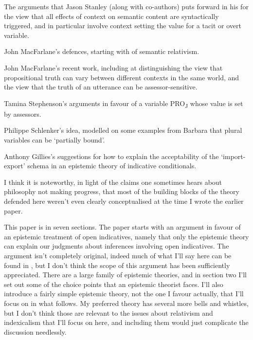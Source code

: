 \medskip
\renewcommand{\labelenumi}{\arabic{enumi}.}
\begin{enumerate*}
\item The arguments that Jason Stanley (along with co-authors) puts forward in his \citeyearpar{Stanley2007-STALIC} for the view that all effects of context on semantic content are syntactically triggered, and in particular involve context setting the value for a tacit or overt variable. 
\item John MacFarlane's defences, starting with \cite{MacFarlane2003-MACFCA-2} of semantic relativism.
\item John MacFarlane's recent work, including \cite{MacFarlane2009-MACNC} at distinguishing the view that propositional truth can vary between different contexts in the same world, and the view that the truth of an utterance can be assessor-sensitive.
\item Tamina Stephenson's \citeyearpar{Stephenson2007} arguments in favour of a variable PRO\textsubscript{J} whose value is set by assessors.
\item Philippe Schlenker's \citeyearpar{Schlenker2003} idea, modelled on some examples from Barbara  \cite{Partee1989} that plural variables can be `partially bound'.
\item Anthony Gillies's \citeyearpar{Gillies2009-GILOTF} suggestions for how to explain the acceptability of the `import\nobreakdash-export' schema in an epistemic theory of indicative conditionals.
\end{enumerate*}

\noindent I think it is noteworthy, in light of the claims one sometimes hears about philosophy not making progress, that most of the building blocks of the theory defended here weren't even clearly conceptualised at the time I wrote the earlier paper.

This paper is in seven sections. The paper starts with an argument in favour of an epistemic treatment of open indicatives, namely that only the epistemic theory can explain our judgments about inferences involving open indicatives. The argument isn't completely original, indeed much of what I'll say here can be found in \cite{Stalnaker1975-STAIC}, but I don't think the scope of this argument has been sufficiently appreciated. There are a large family of epistemic theories, and in section two I'll set out some of the choice points that an epistemic theorist faces. I'll also introduce a fairly simple epistemic theory, not the one I favour actually, that I'll focus on in what follows. My preferred theory has several more bells and whistles, but I don't think those are relevant to the issues about relativism and indexicalism that I'll focus on here, and including them would just complicate the discussion needlessly.

